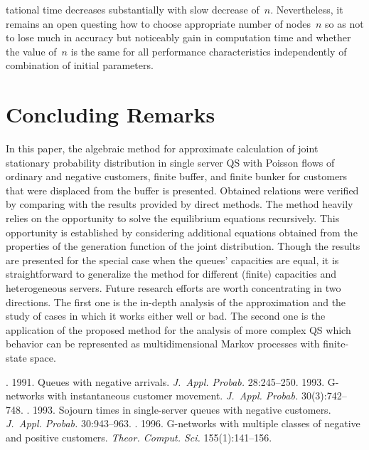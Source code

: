 \begin{multicols}{2}
\vspace*{10pt}


\noindent
tational time decreases substantially
with slow decrease of~$n$. Nevertheless, it remains an
open questing how to choose appropriate number of nodes~$n$
so as not to lose much in accuracy but noticeably gain in computation time
and whether the value of~$n$ is the same for all performance characteristics
independently of combination of initial parameters.



\section{Concluding Remarks}


\noindent
In this paper, the algebraic method for
approximate calculation of joint stationary probability distribution
in single server QS with Poisson flows of ordinary and negative customers,
finite buffer, and finite bunker for customers that were displaced from 
the buffer is presented.
Obtained relations were verified by comparing with the results provided by direct methods.
The method heavily relies on the opportunity to  solve the equilibrium equations recursively.
This opportunity is established by considering additional equations obtained from 
the properties of the generation function of  the joint distribution.
Though the results are presented for the special case
when the queues' capacities are equal, it is straightforward 
to generalize the method for different (finite) capacities  and heterogeneous servers.
Future research efforts are worth concentrating in two directions.
The first one is the in-depth analysis of the approximation and
the study of cases in which it works either well or bad.
The second one is the application of the proposed method for the analysis
of more complex QS which behavior 
can be represented as multidimensional Markov processes with finite-state space.

\renewcommand{\bibname}{\protect\rmfamily References}



{\small\frenchspacing
{%
\begin{thebibliography}{99}

. 1991. Queues with negative arrivals. 
\textit{J.~Appl. Probab.} 28:245--250.
 1993. G-networks with instantaneous customer movement. 
\textit{J.~Appl. Probab.} 30(3):742--748.
. 1993. 
Sojourn times in single-server queues with negative customers.
\textit{J.~Appl. Probab.} 30:943--963.
. 1996. 
\mbox{G-networks} with multiple classes of negative and positive customers.
\textit{Theor. Comput. Sci.} 155(1):141--156.




\end{thebibliography}}}
\end{multicols}
